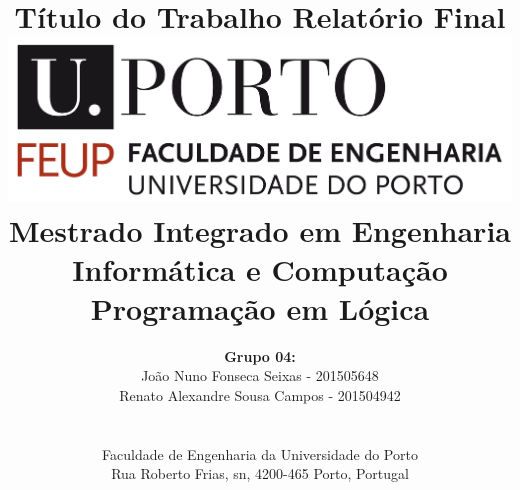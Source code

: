 \documentclass[a4paper]{article}
\begin{document}
\setlength{\textwidth}{16cm}
\setlength{\textheight}{22cm}

\title{\Huge\textbf{Título do Trabalho}\linebreak\linebreak\linebreak
\Large\textbf{Relatório Final}\linebreak\linebreak
\linebreak\linebreak
\includegraphics[scale=0.1]{feup-logo.png}\linebreak\linebreak
\linebreak\linebreak
\Large{Mestrado Integrado em Engenharia Informática e Computação} \linebreak\linebreak
\Large{Programação em Lógica}\linebreak
}

\author{\textbf{Grupo 04:}\\ João Nuno Fonseca Seixas - 201505648 \\ Renato Alexandre Sousa Campos - 201504942 \\\linebreak\linebreak \\
 \\ Faculdade de Engenharia da Universidade do Porto \\ Rua Roberto Frias, s\/n, 4200-465 Porto, Portugal \linebreak\linebreak\linebreak
\linebreak\linebreak\vspace{1cm}}
\maketitle
\thispagestyle{empty}
\end{document}
